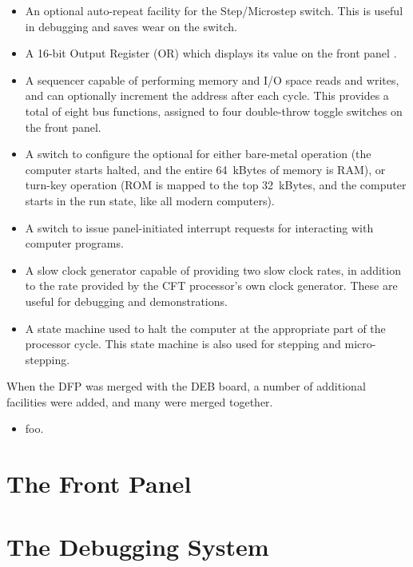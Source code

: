 \begin{itemize}
\item An optional auto-repeat facility for the Step/Microstep
  switch. This is useful in debugging and saves wear on the switch.

\item A 16-bit Output Register (OR) which displays its value on the
  front panel .

\item A sequencer capable of performing memory and I/O space reads and
  writes, and can optionally increment the address after each
  cycle. This provides a total of eight bus functions, assigned to
  four double-throw toggle switches on the front panel.

\item A switch to configure the optional  for either
  bare-metal operation (the computer starts halted, and the entire
  64~kBytes of memory is RAM), or turn-key operation (ROM is mapped to
  the top 32~kBytes, and the computer starts in the run state, like
  all modern computers).

\item A switch to issue panel-initiated interrupt requests for
  interacting with computer programs.

\item A slow clock generator capable of providing two slow clock
  rates, in addition to the rate provided by the CFT processor's own
  clock generator. These are useful for debugging and demonstrations.
  
\item A state machine used to halt the computer at the appropriate
  part of the processor cycle. This state machine is also used for
  stepping and micro-stepping.

\end{itemize}

When the DFP was merged with the DEB board, a number of additional
facilities were added, and many were merged together.

\begin{itemize}

\item foo.

\end{itemize}


\section{The Front Panel}

\section{The Debugging System}

